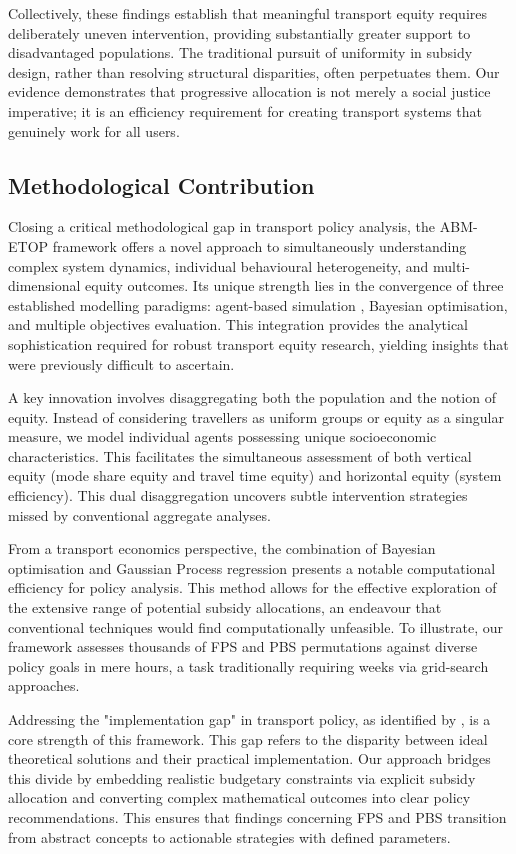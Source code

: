 \documentclass[a4paper,fleqn]{cas-sc}
\begin{document}
Collectively, these findings establish that meaningful transport equity requires deliberately uneven intervention, providing substantially greater support to disadvantaged populations. The traditional pursuit of uniformity in subsidy design, rather than resolving structural disparities, often perpetuates them. Our evidence demonstrates that progressive allocation is not merely a social justice imperative; it is an efficiency requirement for creating transport systems that genuinely work for all users.

\subsection{Methodological Contribution}
Closing a critical methodological gap in transport policy analysis, the ABM-ETOP framework offers a novel approach to simultaneously understanding complex system dynamics, individual behavioural heterogeneity, and multi-dimensional equity outcomes. Its unique strength lies in the convergence of three established modelling paradigms: agent-based simulation , Bayesian optimisation, and multiple objectives evaluation. This integration provides the analytical sophistication required for robust transport equity research, yielding insights that were previously difficult to ascertain.

A key innovation involves disaggregating both the population and the notion of equity. Instead of considering travellers as uniform groups or equity as a singular measure, we model individual agents possessing unique socioeconomic characteristics. This facilitates the simultaneous assessment of both vertical equity (mode share equity and travel time equity) and horizontal equity (system efficiency). This dual disaggregation uncovers subtle intervention strategies missed by conventional aggregate analyses.

From a transport economics perspective, the combination of Bayesian optimisation and Gaussian Process regression presents a notable computational efficiency for policy analysis. This method allows for the effective exploration of the extensive range of potential subsidy allocations, an endeavour that conventional techniques would find computationally unfeasible. To illustrate, our framework assesses thousands of FPS and PBS permutations against diverse policy goals in mere hours, a task traditionally requiring weeks via grid-search approaches.

Addressing the "implementation gap" in transport policy, as identified by \citet{Banister2008}, is a core strength of this framework. This gap refers to the disparity between ideal theoretical solutions and their practical implementation. Our approach bridges this divide by embedding realistic budgetary constraints via explicit subsidy allocation and converting complex mathematical outcomes into clear policy recommendations. This ensures that findings concerning FPS and PBS transition from abstract concepts to actionable strategies with defined parameters.
\end{document}

